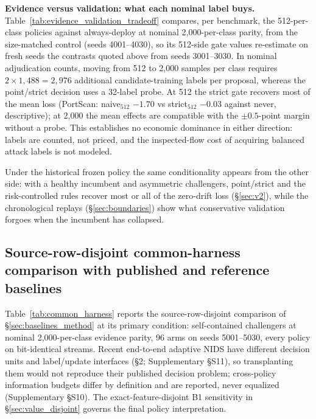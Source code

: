 \documentclass[journal]{IEEEtran}
\begin{document}
\textbf{Evidence versus validation: what each nominal label buys.} Table~\ref{tab:evidence_validation_tradeoff} compares, per benchmark, the 512-per-class policies against always-deploy at nominal 2{,}000-per-class parity, from the size-matched control (seeds 4001--4030), so its 512-side gate values re-estimate on fresh seeds the contrasts quoted above from seeds 3001--3030. In nominal adjudication counts, moving from 512 to 2{,}000 samples per class requires $2\times1{,}488 = 2{,}976$ additional candidate-training labels per proposal, whereas the point/strict decision uses a 32-label probe. At 512 the strict gate recovers most of the mean loss (PortScan: naive$_{512}$ $-1.70$ vs strict$_{512}$ $-0.03$ against never, descriptive); at 2{,}000 the mean effects are compatible with the $\pm0.5$-point margin without a probe. This establishes no economic dominance in either direction: labels are counted, not priced, and the inspected-flow cost of acquiring balanced attack labels is not modeled.



Under the historical frozen policy the same conditionality appears from the other side: with a healthy incumbent and asymmetric challengers, point/strict and the risk-controlled rules recover most or all of the zero-drift loss (\S\ref{sec:v2}), while the chronological replays (\S\ref{sec:boundaries}) show what conservative validation forgoes when the incumbent has collapsed.

\subsection{Source-row-disjoint common-harness comparison with published and reference baselines}
\label{sec:baselines}

Table~\ref{tab:common_harness} reports the source-row-disjoint comparison of \S\ref{sec:baselines_method} at its primary condition: self-contained challengers at nominal 2{,}000-per-class evidence parity, 96 arms on seeds 5001--5030, every policy on bit-identical streams. Recent end-to-end adaptive NIDS have different decision units and label/update interfaces (\S2; Supplementary \S S11), so transplanting them would not reproduce their published decision problem; cross-policy information budgets differ by definition and are reported, never equalized (Supplementary \S S10). The exact-feature-disjoint B1 sensitivity in \S\ref{sec:value_disjoint} governs the final policy interpretation.
\end{document}
